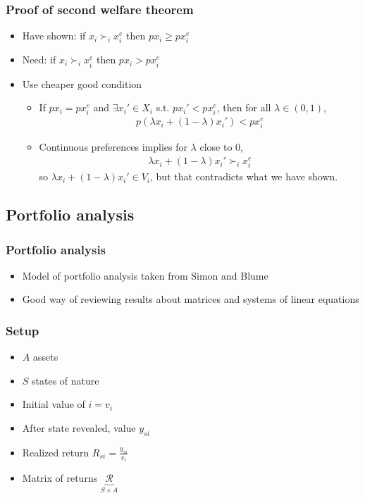 \documentclass[compress]{beamer}
\newcommand{\pref}{\succ}
\begin{document}
\begin{frame}
  \frametitle{Proof of second welfare theorem}
  \begin{itemize}
  \item Have shown: if $x_i \pref_i x_i^e$ then  $p x_i \geq p x_i^e$
  \item Need: if $x_i \pref_i x_i^e$ then  $p x_i > p x_i^e$
  \item Use cheaper good condition
    \begin{itemize}
    \item If $p x_i = p x_i^e$ and $\exists x_i' \in X_i$ s.t. $p x_i'
      < p x_i^e$, then for all $\lambda \in (0,1)$,
      \begin{align}
        p(\lambda x_i +(1-\lambda) x_i') < p x_i^e
      \end{align}
    \item Continuous preferences implies for $\lambda$ close to $0$, 
      \begin{align}
        \lambda x_i + (1-\lambda)x_i' \pref_i x_i^e      
      \end{align}
      so $\lambda x_i + (1-\lambda) x_i' \in V_i$, but that
      contradicts what we have shown.
    \end{itemize}
  \end{itemize}
\end{frame}

\subsection{Portfolio analysis}

\begin{frame}
  \frametitle{Portfolio analysis}
  \begin{itemize}
  \item Model of portfolio analysis taken from Simon and Blume
  \item Good way of reviewing results about matrices and systems of
    linear equations 
  \end{itemize}
\end{frame}

\begin{frame}
  \frametitle{Setup}
  \begin{itemize}
  \item $A$ assets
  \item $S$ states of nature
  \item Initial value of $i = v_i$
  \item After state revealed, value $y_{si}$
  \item Realized return $R_{si} = \frac{y_{si}}{v_i}$
  \item Matrix of returns $\underbrace{\mathcal{R}}_{S \times A}$
  \end{itemize}
\end{frame}
\end{document}
